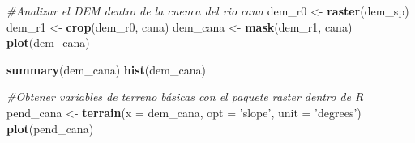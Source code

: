 \documentclass[11pt,]{article}
\newenvironment{Shaded}{\begin{snugshade}}{\end{snugshade}}
\newcommand{\KeywordTok}[1]{\textcolor[rgb]{0.13,0.29,0.53}{\textbf{#1}}}
\newcommand{\DataTypeTok}[1]{\textcolor[rgb]{0.13,0.29,0.53}{#1}}
\newcommand{\StringTok}[1]{\textcolor[rgb]{0.31,0.60,0.02}{#1}}
\newcommand{\CommentTok}[1]{\textcolor[rgb]{0.56,0.35,0.01}{\textit{#1}}}
\newcommand{\NormalTok}[1]{#1}
\begin{document}
\begin{Shaded}
\begin{Highlighting}[]
\CommentTok{#Analizar el DEM dentro de la cuenca del rio cana}
\NormalTok{dem_r0 <-}\StringTok{ }\KeywordTok{raster}\NormalTok{(dem_sp)}
\NormalTok{dem_r1 <-}\StringTok{ }\KeywordTok{crop}\NormalTok{(dem_r0, cana)}
\NormalTok{dem_cana <-}\StringTok{ }\KeywordTok{mask}\NormalTok{(dem_r1, cana)}
\KeywordTok{plot}\NormalTok{(dem_cana)}

\KeywordTok{summary}\NormalTok{(dem_cana)}
\KeywordTok{hist}\NormalTok{(dem_cana)}

\CommentTok{#Obtener variables de terreno básicas con el paquete raster dentro de R}
\NormalTok{pend_cana <-}\StringTok{ }\KeywordTok{terrain}\NormalTok{(}\DataTypeTok{x =}\NormalTok{ dem_cana, }\DataTypeTok{opt =} \StringTok{'slope'}\NormalTok{, }\DataTypeTok{unit =} \StringTok{'degrees'}\NormalTok{)}
\KeywordTok{plot}\NormalTok{(pend_cana)}
\end{Highlighting}
\end{Shaded}
\end{document}
